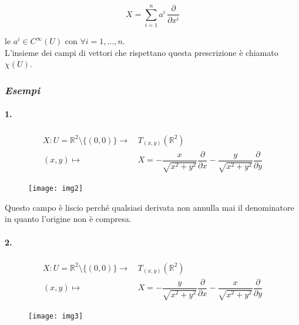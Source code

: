 \begin{equation}
	X = \sum_{i=1}^{n} a^{i} \, \dfrac{\partial}{\partial x^{i}}
\end{equation}

le $ a^{i} \in C^{\infty}(U) $ con $ \forall i=1,\dots,n $.\\
L'insieme dei campi di vettori che rispettano questa prescrizione è chiamato $ \chi(U) $.

\subsubsection{\textit{Esempi}}

\paragraph{1.}

\begin{align}
	\begin{split}
		X : U = \mathbb{R}^{2} \setminus \{(0,0)\} \to& \, T_{(x,y)}(\mathbb{R}^{2})\\
		(x,y) \mapsto& \, X = - \dfrac{x}{\sqrt{x^{2}+y^{2}}} \dfrac{\partial}{\partial x} - \dfrac{y}{\sqrt{x^{2}+y^{2}}} \dfrac{\partial}{\partial y}
	\end{split}
\end{align}

\begin{figure}[H]
	\centering
	\texttt{[image: img2]}
\end{figure}

Questo campo è liscio perché qualsiasi derivata non annulla mai il denominatore in quanto l'origine non è compresa.

\paragraph{2.}

\begin{align}
	\begin{split}
		X : U = \mathbb{R}^{2} \setminus \{(0,0)\} \to& \, T_{(x,y)}(\mathbb{R}^{2})\\
		(x,y) \mapsto& \, X = - \dfrac{y}{\sqrt{x^{2}+y^{2}}} \dfrac{\partial}{\partial x} - \dfrac{x}{\sqrt{x^{2}+y^{2}}} \dfrac{\partial}{\partial y}
	\end{split}
\end{align}

\begin{figure}[H]
	\centering
	\texttt{[image: img3]}
\end{figure}

